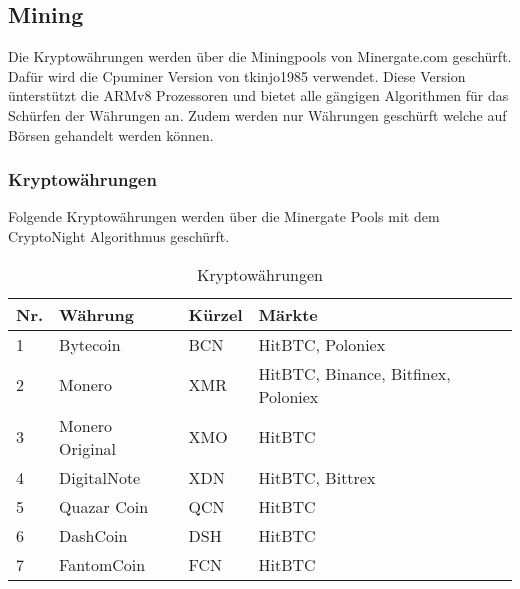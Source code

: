 \subsection{Mining}
Die Kryptowährungen werden über die Miningpools von Minergate.com geschürft. Dafür wird die Cpuminer Version von tkinjo1985 verwendet. Diese Version ünterstützt die ARMv8 Prozessoren und bietet alle gängigen Algorithmen für das Schürfen der Währungen an.
Zudem werden nur Währungen geschürft welche auf Börsen gehandelt werden können.


\subsubsection{Kryptowährungen}
Folgende Kryptowährungen werden über die Minergate Pools mit dem CryptoNight Algorithmus geschürft.

\begin{table}[H]
\centering
\begin{tabular}{p{1cm}p{3.5cm}p{2cm}p{9.5cm}}
\hline
\rowcolor{heading} \textbf{Nr.} & \textbf{Währung} & \textbf{Kürzel} &\textbf{Märkte } \\\hline
1 & Bytecoin & BCN & HitBTC, Poloniex \\\hline
2 & Monero & XMR & HitBTC, Binance, Bitfinex, Poloniex \\\hline
3 & Monero Original & XMO & HitBTC \\\hline
4 & DigitalNote & XDN & HitBTC, Bittrex \\\hline
5 & Quazar Coin & QCN & HitBTC \\\hline
6 & DashCoin & DSH & HitBTC \\\hline
7 & FantomCoin & FCN & HitBTC \\\hline
\end{tabular}
\caption{Kryptowährungen}
\end{table}


